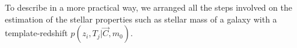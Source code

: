\documentclass[9pt]{memoir}
\begin{document}
%

To describe in a more practical way, we arranged all the steps involved on the estimation of the stellar properties such as stellar mass of a galaxy with a template-redshift $p(z_i, T_j|\vec{C}, m_0)$.
\end{document}
